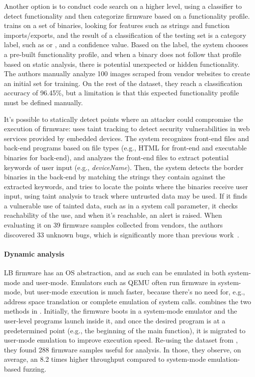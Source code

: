 Another option is to conduct code search on a higher level, using a classifier to detect functionality and then categorize firmware based on a functionality profile.
 trains on a set of binaries, looking for features such as strings and function imports/exports, and the result of a classification of the testing set is a category label, such as  or , and a confidence value.
Based on the label, the system chooses a pre-built functionality profile, and when a binary does not follow that profile based on static analysis, there is potential unexpected or hidden functionality.
The authors manually analyze \num{100} images scraped from vendor websites to create an initial set for training.
On the rest of the dataset, they reach a classification accuracy of 96.45\%, but a limitation is that this expected functionality profile must be defined manually.

It's possible to statically detect points where an attacker could compromise the execution of firmware:  uses taint tracking to detect security vulnerabilities in web services provided by embedded devices.
The system recognizes front-end files and back-end programs based on file types (e.g., HTML for front-end and executable binaries for back-end), and analyzes the front-end files to extract potential keywords of user input (e.g., \textit{deviceName}).
Then, the system detects the border binaries in the back-end by matching the strings they contain against the extracted keywords, and tries to locate the points where the binaries receive user input, using taint analysis to track where untrusted data may be used.
If it finds a vulnerable use of tainted data, such as in a system call parameter, it checks reachability of the use, and when it's reachable, an alert is raised.
When evaluating it on \num{39} firmware samples collected from vendors, the authors discovered \num{33} unknown bugs, which is significantly more than previous work~\cite{redini2020karonte}.

\paragraph{Dynamic analysis}
LB firmware has an OS abstraction, and as such can be emulated in both system-mode and user-mode.
Emulators such as QEMU often run firmware in system-mode, but user-mode execution is much faster, because there's no need for, e.g., address space translation or complete emulation of system calls.
 combines the two methods in .
Initially, the firmware boots in a system-mode emulator and the user-level programs launch inside it, and once the desired program is at a predetermined point (e.g., the beginning of the main function), it is migrated to user-mode emulation to improve execution speed.
Re-using the dataset from , they found \num{288} firmware samples useful for analysis.
In those, they observe, on average, an 8.2 times higher throughput compared to system-mode emulation-based fuzzing.


